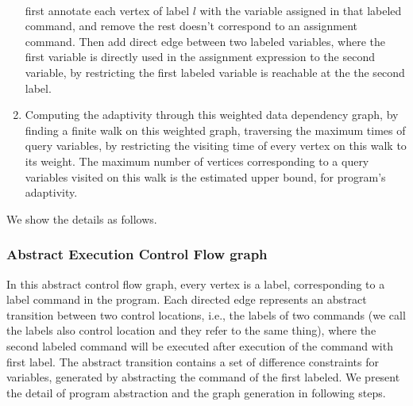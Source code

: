 \begin{enumerate}
\\
first annotate each vertex of label $l$ with the variable 
assigned in that labeled command, and remove the rest doesn't correspond to an assignment command.
Then 
add direct edge between two labeled variables,
where the first variable 
is directly used in the assignment expression to the second variable, by restricting 
the first labeled variable is reachable at the the second label.
%
\item Computing the adaptivity through this weighted data dependency graph,
    by finding a finite walk on this weighted graph, 
traversing the maximum times of query variables, by restricting the visiting time of every vertex on this walk to its weight.
The maximum number of vertices corresponding to a query variables visited on this walk is the estimated upper bound, for program's adaptivity.
\end{enumerate}

We show the details as follows.
\subsubsection{Abstract Execution Control Flow graph}
In this abstract control flow graph, every vertex is a label,
 corresponding to a label command in the program.
Each directed 
 edge represents an abstract transition 
 between two control locations, i.e., the labels of two commands (we call the labels also control location and they refer to the same thing), 
 where the second labeled command will be executed after execution of the command with first label.
 The abstract transition contains a set of difference constraints for variables, generated by abstracting the command of the first labeled.
 We present the detail of program abstraction and the graph generation in following steps.
%
